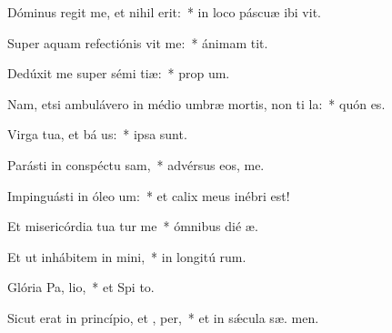\item Dóminus regit me, et nihil  erit:~* in loco páscuæ ibi  vit.
\item Super aquam refectiónis vit me:~* ánimam  tit.
\item Dedúxit me super sémi tiæ:~* prop  um.
\item Nam, etsi ambulávero in médio umbræ mortis, non ti la:~* quón   es.
\item Virga tua, et bá us:~* ipsa   sunt.
\item Parásti in conspéctu  sam,~* advérsus eos,   me.
\item Impinguásti in óleo  um:~* et calix meus inébri   est!
\item Et misericórdia tua tur me~* ómnibus dié  æ.
\item Et ut inhábitem in  mini,~* in longitú rum.
\item Glória Pa,  lio,~* et Spi to.
\item Sicut erat in princípio, et ,  per,~* et in sǽcula sæ. men.

